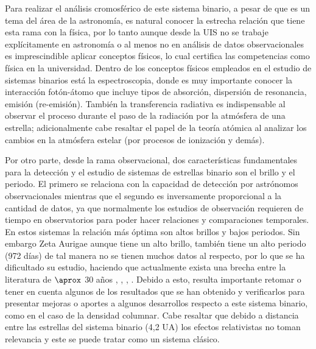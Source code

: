 \documentclass[11pt]{article}
\begin{document}
Para realizar el análisis cromosférico de este sistema binario, a pesar de que es un tema del área de la astronomía, es natural conocer la estrecha relación que tiene esta rama con la física, por lo tanto aunque desde la UIS no se trabaje explícitamente en astronomía o al menos no en análisis de datos observacionales es imprescindible aplicar conceptos físicos, lo cual certifica las competencias como física en la universidad. Dentro de los conceptos físicos empleados en el estudio de sistemas binarios está la espectroscopia, donde es muy importante conocer la interacción fotón-átomo que incluye tipos de absorción, dispersión de resonancia, emisión (re-emisión). También la transferencia radiativa es indispensable al observar el proceso durante el paso de la radiación por la atmósfera de una estrella; adicionalmente cabe resaltar el papel de la teoría atómica al analizar los cambios en la atmósfera estelar (por procesos de ionización y demás). 

Por otro parte, desde la rama observacional, dos características fundamentales para la detección y el estudio de sistemas de estrellas binario son el brillo y el periodo. El primero se relaciona con la capacidad de detección por astrónomos observacionales mientras que el segundo es inversamente proporcional a la cantidad de datos, ya que normalmente los estudios de observación requieren de tiempo en observatorios para poder hacer relaciones y comparaciones temporales. En estos sistemas la relación más óptima son altos brillos y bajos periodos. Sin embargo Zeta Aurigae aunque tiene un alto brillo, también tiene un alto periodo (972 días) \cite{wright1970zeta} de tal manera no se tienen muchos datos al respecto, por lo que se ha dificultado su estudio, haciendo que actualmente exista una brecha entre la literatura de $\aprox$ 30 años  \cite{kps9}, \cite{kps1O}, \cite{complete}, \cite{eaton1993chromospheric}. Debido a esto, resulta importante retomar o tener en cuenta algunos de los resultados que se han obtenido y verificarlos para presentar mejoras o aportes a algunos desarrollos respecto a este sistema binario, como en el caso de la densidad columnar. Cabe resaltar que debido a distancia entre las estrellas del sistema binario (4,2 UA) \cite{kps9} los efectos relativistas no toman relevancia y este se puede tratar como un sistema clásico.
\end{document}
